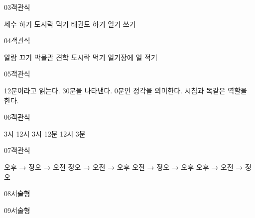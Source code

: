 \documentclass[fs13,seriesSau]{korfarm-base}
\begin{document}
\begin{kfQBlock}{03}{객관식}
\begin{kfChoices}
\kfChoice 세수 하기
\kfChoice 도시락 먹기
\kfChoice 태권도 하기
\kfChoice 일기 쓰기
\end{kfChoices}
\end{kfQBlock}

\begin{kfQBlock}{04}{객관식}
\begin{kfChoices}
\kfChoice 알람 끄기
\kfChoice 박물관 견학
\kfChoice 도시락 먹기
\kfChoice 일기장에 일 적기
\end{kfChoices}
\end{kfQBlock}

\begin{kfQBlock}{05}{객관식}
\begin{kfChoices}
\kfChoice 12분이라고 읽는다.
\kfChoice 30분을 나타낸다.
\kfChoice 0분인 정각을 의미한다.
\kfChoice 시침과 똑같은 역할을 한다.
\end{kfChoices}
\end{kfQBlock}

\begin{kfQBlock}{06}{객관식}
\begin{kfChoices}
\kfChoice 3시
\kfChoice 12시
\kfChoice 3시 12분
\kfChoice 12시 3분
\end{kfChoices}
\end{kfQBlock}

\begin{kfQBlock}{07}{객관식}
\begin{kfChoices}
\kfChoice 오후 → 정오 → 오전
\kfChoice 정오 → 오전 → 오후
\kfChoice 오전 → 정오 → 오후
\kfChoice 오후 → 오전 → 정오
\end{kfChoices}
\end{kfQBlock}

\begin{kfQBlock}{08}{서술형}
\end{kfQBlock}

\begin{kfQBlock}{09}{서술형}
\end{kfQBlock}
\end{document}
